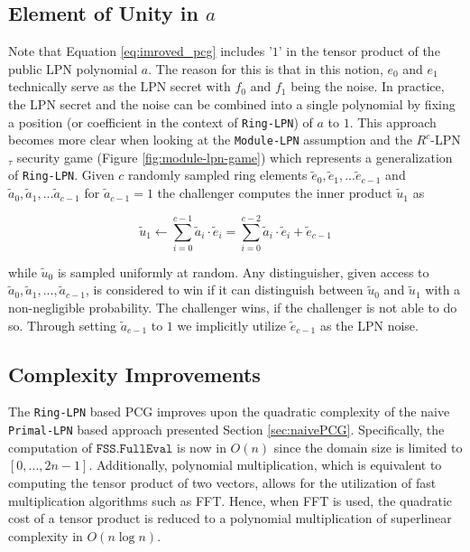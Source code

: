\subsection{Element of Unity in $a$}
Note that Equation \ref{eq:imroved_pcg} includes '$1$' in the tensor product of the public LPN polynomial $a$. The reason for this is that in this notion, $e_0$ and $e_1$ technically serve as the LPN secret with $f_0$ and $f_1$ being the noise. In practice, the LPN secret and the noise can be combined into a single polynomial by fixing a position (or coefficient in the context of \texttt{Ring-LPN}) of $a$ to $1$. This approach becomes more clear when looking at the \texttt{Module-LPN} assumption and the $R^{c}$-LPN$_{\tau}$ security game (Figure \ref{fig:module-lpn-game}) which represents a generalization of \texttt{Ring-LPN}. Given $c$ randomly sampled ring elements $\tilde{e}_0, \tilde{e}_1, ... \tilde{e}_{c-1}$ and $\tilde{a}_0, \tilde{a}_1, ...\tilde{a}_{c-1}$ for $\tilde{a}_{c-1}=1$  the challenger computes the inner product $\tilde{u}_1$ as

\begin{equation}
\label{eq:inner_product_with_a_1}
\tilde{u}_{1} \leftarrow \sum_{i=0}^{c-1} \tilde{a}_{i} \cdot \tilde{e}_{i} = \sum_{i=0}^{c-2} \tilde{a}_{i} \cdot \tilde{e}_{i} + \tilde{e}_{c-1}
\end{equation}

while $\tilde{u}_0$ is sampled uniformly at random. Any distinguisher, given access to $\tilde{a}_0, \tilde{a}_1, ..., \tilde{a}_{c-1}$, is considered to win if it can distinguish between $\tilde{u}_0$ and $\tilde{u}_1$ with a non-negligible probability. The challenger wins, if the challenger is not able to do so. Through setting $\tilde{a}_{c-1}$ to $1$ we implicitly utilize $\tilde{e}_{c-1}$ as the LPN noise.


\subsection{Complexity Improvements}
\label{subsec:VOLEConstruction}
The \texttt{Ring-LPN} based PCG improves upon the quadratic complexity of the naive \texttt{Primal-LPN} based approach presented Section \ref{sec:naivePCG}. Specifically, the computation of $\texttt{FSS.FullEval}$ is now in $O(n)$ since the domain size is limited to $[0, ..., 2n-1]$. Additionally, polynomial multiplication, which is equivalent to computing the tensor product of two vectors, allows for the utilization of fast multiplication algorithms such as FFT. Hence, when FFT is used, the quadratic cost of a tensor product is reduced to a polynomial multiplication of superlinear complexity in $O(n \log n)$.

